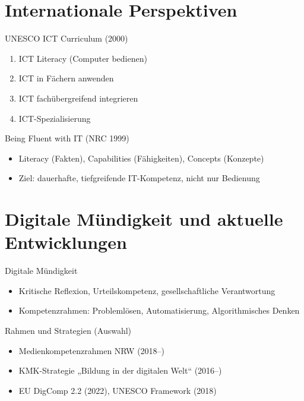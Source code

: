 \documentclass{article}
\begin{document}
\section{Internationale Perspektiven}
\begin{block}{UNESCO ICT Curriculum (2000)}
    \begin{enumerate}
        \item ICT Literacy (Computer bedienen)
        \item ICT in Fächern anwenden
        \item ICT fachübergreifend integrieren
        \item ICT-Spezialisierung
    \end{enumerate}
\end{block}

\begin{block}{Being Fluent with IT (NRC 1999)}
    \begin{itemize}
        \item Literacy (Fakten), Capabilities (Fähigkeiten), Concepts (Konzepte)
        \item Ziel: dauerhafte, tiefgreifende IT-Kompetenz, nicht nur Bedienung
    \end{itemize}
\end{block}

\section{Digitale Mündigkeit und aktuelle Entwicklungen}

\begin{block}{Digitale Mündigkeit}
    \begin{itemize}
        \item Kritische Reflexion, Urteilskompetenz, gesellschaftliche Verantwortung
        \item Kompetenzrahmen: Problemlösen, Automatisierung, Algorithmisches Denken
    \end{itemize}
\end{block}

\begin{block}{Rahmen und Strategien (Auswahl)}
    \begin{itemize}
        \item Medienkompetenzrahmen NRW (2018–)
        \item KMK-Strategie „Bildung in der digitalen Welt“ (2016–)
        \item EU DigComp 2.2 (2022), UNESCO Framework (2018)
    \end{itemize}
\end{block}
\end{document}
